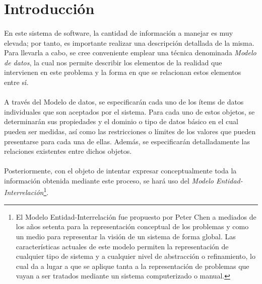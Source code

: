 \section{Introducción}

   \paragraph{}En este sistema de software, la cantidad de información a manejar
   es muy elevada; por tanto, es importante realizar una descripción detallada
   de la misma. Para llevarla a cabo, se cree conveniente emplear una técnica
   denominada \textit{Modelo de datos}, la cual nos permite describir los
   elementos de la realidad que intervienen en este problema y la forma en que
   se relacionan estos elementos entre sí.

   \paragraph{}A través del Modelo de datos, se especificarán cada uno de los
   ítems de datos individuales que son aceptados por el sistema. Para cada uno
   de estos objetos, se determinarán sus propiedades y el dominio o tipo de
   datos básico en el cual pueden ser medidas, así como las restricciones o
   límites de los valores que pueden presentarse para cada una de ellas.
   Además, se especificarán detalladamente las relaciones existentes entre
   dichos objetos.

   \paragraph{}Posteriormente, con el objeto de intentar expresar
   conceptualmente toda la información obtenida mediante este proceso, se hará
   uso del \textit{Modelo Entidad-Interrelación}\footnote{El Modelo
   Entidad-Interrelación fue propuesto por Peter Chen a mediados de los años
   setenta para la representación conceptual de los problemas y como un medio
   para representar la visión de un sistema de forma global. Las características
   actuales de este modelo permiten la representación de cualquier tipo de
   sistema y a cualquier nivel de abstracción o refinamiento, lo cual da a lugar
   a que se aplique tanta a la representación de problemas que vayan a ser
   tratados mediante un sistema computerizado o manual.}.
